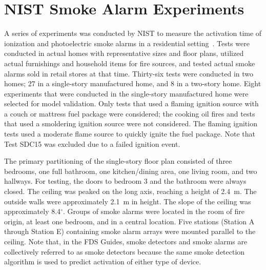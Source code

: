 \section{NIST Smoke Alarm Experiments}

A series of experiments was conducted by NIST to measure the activation time of ionization and photoelectric
smoke alarms in a residential setting~\cite{Bukowski:1}. Tests were conducted in actual homes with
representative sizes and floor plans, utilized actual furnishings and household items for fire sources,
and tested actual smoke alarms sold in retail stores at that time. Thirty-six tests were conducted in two
homes; 27 in a single-story manufactured home, and 8 in a two-story home.
Eight experiments that were conducted in the single-story manufactured home were selected for model validation.
Only tests that used a flaming ignition source with a couch or mattress fuel package were considered;
the cooking oil fires and tests that used a smoldering ignition source were not considered.
The flaming ignition tests used a moderate flame source to quickly ignite the fuel package.
Note that Test SDC15 was excluded due to a failed ignition event.

The primary partitioning of the single-story floor plan consisted
of three bedrooms, one full bathroom, one kitchen/dining area, one living room, and two hallways.
For testing, the doors to bedroom 3 and the bathroom were always closed. The ceiling was peaked
on the long axis, reaching a height of 2.4~m. The outside walls were approximately 2.1~m in height.
The slope of the ceiling was approximately 8.4$^\circ$. Groups of smoke alarms were located in the
room of fire origin, at least one bedroom, and in a central location. Five stations (Station A
through Station E) containing smoke alarm arrays were mounted parallel to the ceiling. Note that,
in the FDS Guides, smoke detectors and smoke alarms are collectively referred to as smoke detectors
because the same smoke detection algorithm is used to predict activation of either type of device.

